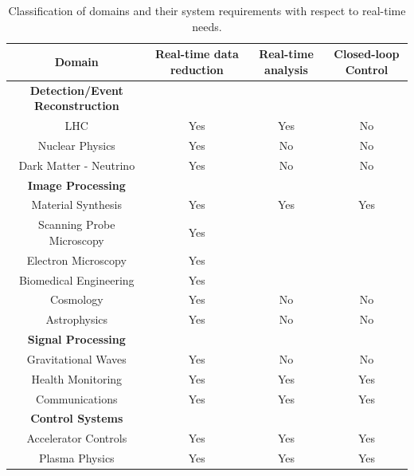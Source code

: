 \begin{table}
\centering
\caption{\label{timing} Classification of domains and their system requirements with respect to real-time needs.}
\small
\begin{tabular}{ c c c c}
\hline
Domain &  Real-time data reduction & Real-time analysis & Closed-loop Control \\
 \hline
 \hline
\textbf{Detection/Event Reconstruction} &    &                              &   \\ 
LHC                                        & Yes & Yes & No \\ 
Nuclear Physics                            & Yes & No                           & No \\ 
Dark Matter - Neutrino                     & Yes  & No                          & No  \\ 
\hline
\textbf{Image Processing}    &   &              &   \\ 
Material Synthesis        & Yes       & Yes   & Yes \\ 
Scanning Probe Microscopy & Yes       &    &          \\ 
Electron Microscopy       & Yes       &    &      \\ 
Biomedical Engineering   & Yes        &    &      \\ 
Cosmology                & Yes        &  No   & No        \\ 
Astrophysics             & Yes       &  No   & No  \\ 
\hline
\textbf{Signal Processing} &  &          &          \\ 
Gravitational Waves        & Yes         &  No      & No      \\ 
Health Monitoring          & Yes & Yes   & Yes      \\ 
Communications             & Yes & Yes   & Yes      \\
\hline
\textbf{Control Systems}   &     &  &   \\ 
Accelerator Controls       & Yes & Yes & Yes  \\ 
Plasma Physics             & Yes & Yes & Yes      
\end{tabular}
\normalsize
\end{table}

